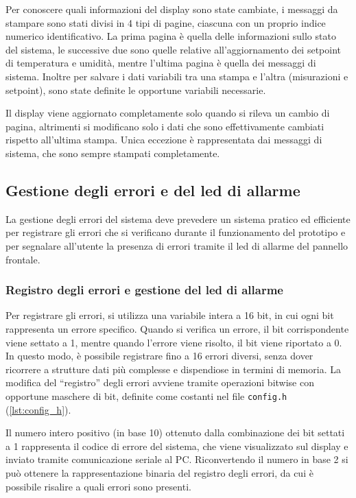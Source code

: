 Per conoscere quali informazioni del display sono state cambiate, i messaggi da stampare sono stati divisi in 4 tipi di
pagine, ciascuna con un proprio indice numerico identificativo. La prima pagina è quella delle informazioni sullo stato
del sistema, le successive due sono quelle relative all'aggiornamento dei setpoint di temperatura e umidità, mentre
l'ultima pagina è quella dei messaggi di sistema. Inoltre per salvare i dati variabili tra una stampa e l'altra (misurazioni
e setpoint), sono state definite le opportune variabili necessarie.

Il display viene aggiornato completamente solo quando si rileva un cambio di pagina, altrimenti si modificano solo i dati
che sono effettivamente cambiati rispetto all'ultima stampa. Unica eccezione è rappresentata dai messaggi di sistema, che
sono sempre stampati completamente.

\subsection{Gestione degli errori e del led di allarme}
La gestione degli errori del sistema deve prevedere un sistema pratico ed efficiente per registrare gli errori che si
verificano durante il funzionamento del prototipo e per segnalare all'utente la presenza di errori tramite il led di allarme
del pannello frontale.

\subsubsection{Registro degli errori e gestione del led di allarme}
Per registrare gli errori, si utilizza una variabile intera a 16 bit, in cui ogni bit rappresenta un errore specifico.
Quando si verifica un errore, il bit corrispondente viene settato a 1, mentre quando l'errore viene risolto, il bit viene
riportato a 0. In questo modo, è possibile registrare fino a 16 errori diversi, senza dover ricorrere a strutture dati più
complesse e dispendiose in termini di memoria. La modifica del ``registro'' degli errori avviene tramite operazioni bitwise
con opportune maschere di bit, definite come costanti nel file \verb|config.h| (\autoref{lst:config_h}).

Il numero intero positivo (in base 10) ottenuto dalla combinazione dei bit settati a 1 rappresenta il codice di errore del
sistema, che viene visualizzato sul display e inviato tramite comunicazione seriale al PC. Riconvertendo il numero in base
2 si può ottenere la rappresentazione binaria del registro degli errori, da cui è possibile risalire a quali errori sono
presenti.

